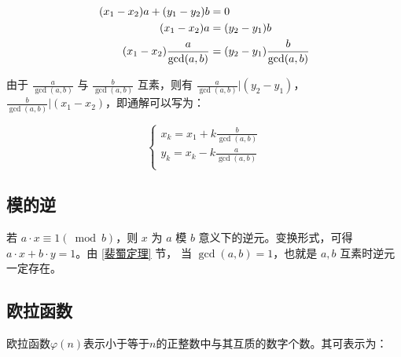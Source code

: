 \documentclass[a4paper]{article}         %
\begin{document}
\begin{equation}
    \begin{aligned} \notag
        (x_1 - x_2)a + (y_1 - y_2)b & = 0 \\
        (x_1 - x_2)a & = (y_2 - y_1)b \\
        (x_1 - x_2) \frac{a}{\gcd(a, b)} & = (y_2 - y_1) \frac{b}{\gcd(a, b)} \\
    \end{aligned}
\end{equation}

由于 $\frac{a}{\gcd(a, b)}$ 与 $\frac{b}{\gcd(a, b)}$ 互素，则有 $\frac{a}{\gcd(a, b)} \vert (y_2 - y_1)$，$\frac{b}{\gcd(a, b)} \vert (x_1 - x_2)$，即通解可以写为：

\begin{equation}
    \begin{cases}
        x_k = x_1 + k \frac{b}{\gcd(a, b)} \\
        y_k = x_k - k \frac{a}{\gcd(a, b)} \\
    \end{cases}
\end{equation}
\subsection{模的逆}



若 $a \cdot x \equiv 1 (\bmod b)$，则 $x$ 为 $a$ 模 $b$ 意义下的逆元。变换形式，可得$a \cdot x + b \cdot y = 1$。由 \ref{裴蜀定理} 节， 当 $\gcd(a, b) = 1$，也就是 $a, b$ 互素时逆元一定存在。

\subsection{欧拉函数}

欧拉函数$\varphi(n)$表示小于等于$n$的正整数中与其互质的数字个数。其可表示为：
\end{document}
